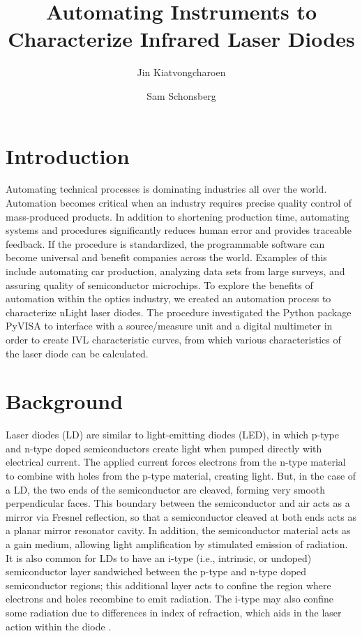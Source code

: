 \documentclass[9pt,twocolumn,twoside]{osajnl}
\title{Automating Instruments to Characterize Infrared Laser Diodes}
\author[1]{Jin Kiatvongcharoen}
\author[2]{Sam Schonsberg}
\affil[1,2]{Knight Campus Graduate Internship Program, University of Oregon, Eugene, OR 97403}
\affil[1]{jkiatvon@uoregon.edu}
\affil[2]{sschons2@uoregon.edu}
\begin{document}
\maketitle
\raggedbottom


\section{Introduction}
\indent \indent Automating technical processes is dominating industries all over the world. Automation becomes critical when an industry requires precise quality control of mass-produced products. In addition to shortening production time, automating systems and procedures significantly reduces human error and provides traceable feedback. If the procedure is standardized, the programmable software can become universal and benefit companies across the world. Examples of this include automating car production, analyzing data sets from large surveys, and assuring quality of semiconductor microchips. To explore the benefits of automation within the optics industry, we created an automation process to characterize nLight laser diodes. The procedure investigated the Python package PyVISA to interface with a source/measure unit and a digital multimeter in order to create IVL characteristic curves, from which various characteristics of the laser diode can be calculated.


\section{Background}

\indent \indent Laser diodes (LD) are similar to light-emitting diodes (LED), in which p-type and n-type doped semiconductors create light when pumped directly with electrical current. The applied current forces electrons from the n-type material to combine with holes from the p-type material, creating light. But, in the case of a LD, the two ends of the semiconductor are cleaved, forming very smooth perpendicular faces. This boundary between the semiconductor and air acts as a mirror via Fresnel reflection, so that a semiconductor cleaved at both ends acts as a planar mirror resonator cavity. In addition, the semiconductor material acts as a gain medium, allowing light amplification by stimulated emission of radiation. It is also common for LDs to have an i-type (i.e., intrinsic, or undoped) semiconductor layer sandwiched between the p-type and n-type doped semiconductor regions; this additional layer acts to confine the region where electrons and holes recombine to emit radiation. The i-type may also confine some radiation due to differences in index of refraction, which aids in the laser action within the diode \cite{Coldren}.
\end{document}
